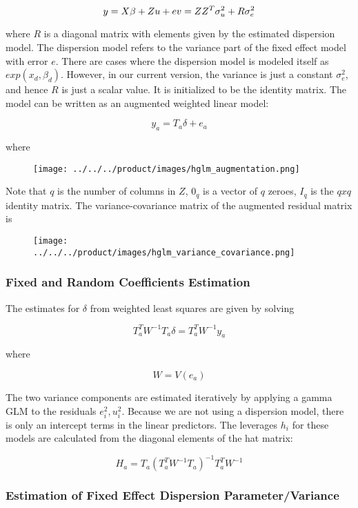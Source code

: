 $$y = X\beta + Zu + e \\
v = ZZ^T\sigma_u^2 + R\sigma_e^2$$

where $R$ is a diagonal matrix with elements given by the estimated dispersion model. The dispersion model refers to the variance part of the fixed effect model with error $e$. There are cases where the dispersion model is modeled itself as $exp(x_d, \beta_d)$. However, in our current version, the variance is just a constant $\sigma_e^2$, and hence $R$ is just a scalar value. It is initialized to be the identity matrix. The model can be written as an augmented weighted linear model:

$$y_a = T_a \delta + e_a$$

where

\begin{figure}[H]
\centering
\texttt{[image: ../../../product/images/hglm\_augmentation.png]}
\end{figure}

Note that $q$ is the number of columns in $Z$, $0_q$ is a vector of $q$ zeroes, $I_q$ is the $qxq$ identity matrix. The variance-covariance matrix of the augmented residual matrix is

\begin{figure}[H]
\centering
\texttt{[image: ../../../product/images/hglm\_variance\_covariance.png]}
\end{figure}

\subsubsection{Fixed and Random Coefficients Estimation}

The estimates for $\delta$ from weighted least squares are given by solving

$$T_a^T W^{-1} T_a \delta=T_a^T W^{-1} y_a$$

where

$$W= V(e_a )$$

The two variance components are estimated iteratively by applying a gamma GLM to the residuals $e_i^2,u_i^2$. Because we are not using a dispersion model, there is only an intercept terms in the linear predictors. The leverages $h_i$ for these models are calculated from the diagonal elements of the hat matrix:

$$H_a=T_a (T_a^T W^{-1} T_a )^{-1} T_a^T W^{-1}$$

\subsubsection{Estimation of Fixed Effect Dispersion Parameter/Variance}

